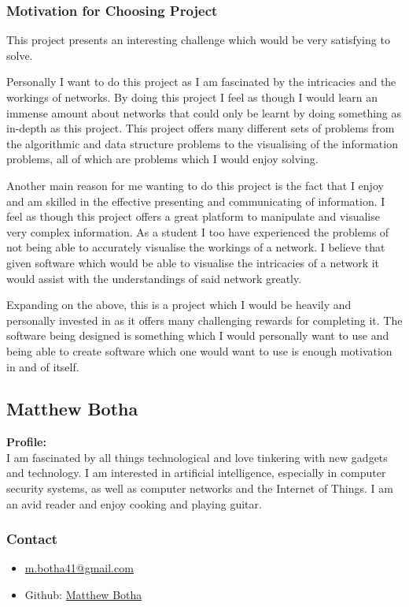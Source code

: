 \documentclass{article}
\begin{document}
	\subsubsection{Motivation for Choosing Project}
		This project presents an interesting challenge which would be very satisfying to solve.
		
		Personally I want to do this project as I am fascinated by the intricacies and the workings of networks. By doing this project I feel as though I would learn an immense amount about networks that could only be learnt by doing something as in-depth as this project. This project offers many different sets of problems from the algorithmic and data structure problems to the visualising of the information problems, all of which are problems which I would enjoy solving.
		
		Another main reason for me wanting to do this project is the fact that I enjoy and am skilled in the effective presenting and communicating of information. I feel as though this project offers a great platform to manipulate and visualise very complex information. As a student I too have experienced the problems of not being able to accurately visualise the workings of a network. I believe that given software which would be able to visualise the intricacies of a network it would assist with the understandings of said network greatly.
		
		Expanding on the above, this is a project which I would be heavily and personally invested in as it offers many challenging rewards for completing it. The software being designed is something which I would personally want to use and being able to create software which one would want to use is enough motivation in and of itself.
	
	\newpage
	\subsection{Matthew Botha}
		\textbf{Profile:}\\
		I am fascinated by all things technological and love tinkering with new gadgets and technology. I am interested in artificial intelligence, especially in computer security systems, as well as computer networks and the Internet of Things. I am an avid reader and enjoy cooking and playing guitar.
		\subsubsection{Contact}
			\begin{itemize}
				\item \href{mailto:m.botha41@gmail.com}{m.botha41@gmail.com}
				\item Github: \href{https://github.com/MatthewBotha}{Matthew Botha}
			\end{itemize}
\end{document}
